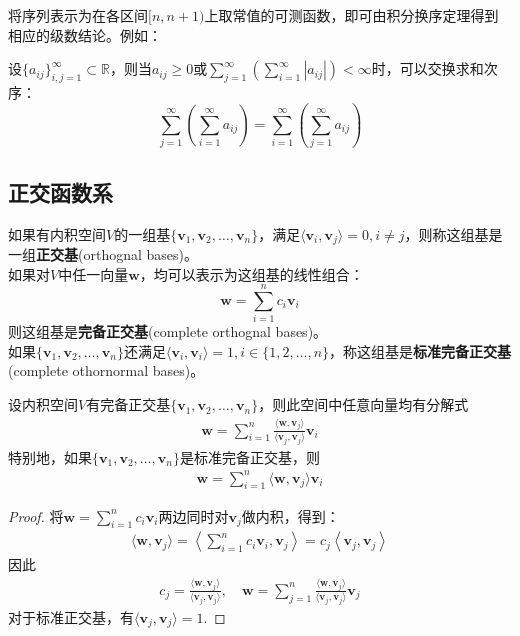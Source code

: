 将序列表示为在各区间$[n,n+1)$上取常值的可测函数，即可由积分换序定理得到相应的级数结论。例如：
\begin{corollary}\label{cor:sequence_fubini_tonelli}
    设$\{a_{ij}\}_{i,j=1}^{\infty}\subset\mathbb{R}$，则当$a_{ij}\ge 0$或$\sum_{j=1}^{\infty}\left(\sum_{i=1}^{\infty}|a_{ij}|\right)<\infty$时，可以交换求和次序：
    $$\sum_{j=1}^{\infty}\left(\sum_{i=1}^{\infty}a_{ij}\right)=\sum_{i=1}^{\infty}\left(\sum_{j=1}^{\infty}a_{ij}\right)$$
\end{corollary}

\subsection{正交函数系}\label{sub:orthognal}
\begin{definition}[正交基]
    如果有内积空间$V$的一组基$\{\mathbf{v}_1,\mathbf{v}_2,\dots ,\mathbf{v}_n\}$，满足$\langle \mathbf{v}_i,\mathbf{v}_j\rangle =0,i \neq j$，则称这组基是一组\textbf{正交基}(orthognal bases)。\\
    如果对$V$中任一向量$\mathbf{w}$，均可以表示为这组基的线性组合：
    \[\mathbf{w}=\sum_{i = 1}^{n}  c_i \mathbf{v}_i\]
    则这组基是\textbf{完备正交基}(complete orthognal bases)。\\
    如果$\{\mathbf{v}_1,\mathbf{v}_2,\dots ,\mathbf{v}_n\}$还满足$\langle \mathbf{v}_i,\mathbf{v}_i\rangle =1,i\in \{1,2,\dots ,n\}$，称这组基是\textbf{标准完备正交基} (complete othornormal bases)。
\end{definition}

\begin{theorem}\label{thm:vector_decomposition}
    设内积空间$V$有完备正交基$\{\mathbf{v}_1,\mathbf{v}_2,\dots ,\mathbf{v}_n\}$，则此空间中任意向量均有分解式
    \begin{align*}
        \mathbf{w}=\sum_{i=1}^{n}\frac{\langle \mathbf{w},\mathbf{v}_j \rangle}{\langle \mathbf{v}_j,\mathbf{v}_j \rangle}\mathbf{v}_i
    \end{align*}
    特别地，如果$\{\mathbf{v}_1,\mathbf{v}_2,\dots ,\mathbf{v}_n\}$是标准完备正交基，则
    \begin{align*}
        \mathbf{w}=\sum_{i=1}^{n}\langle \mathbf{w},\mathbf{v}_j \rangle\mathbf{v}_i
    \end{align*}
\end{theorem}
\begin{proof}
    将$\mathbf{w}=\sum_{i = 1}^{n}  c_i \mathbf{v}_i$两边同时对$\mathbf{v}_j$做内积，得到：
    \begin{align*}
        \langle \mathbf{w},\mathbf{v}_j \rangle=\left\langle \sum_{i = 1}^{n}  c_i \mathbf{v}_i,\mathbf{v}_j \right\rangle =c_j\left\langle \mathbf{v}_j,\mathbf{v}_j \right\rangle
    \end{align*}
    因此\begin{align*}
        c_j=\frac{\langle \mathbf{w},\mathbf{v}_j \rangle}{\langle \mathbf{v}_j,\mathbf{v}_j \rangle},\quad\mathbf{w}=\sum_{j = 1}^{n}  \frac{\langle \mathbf{w},\mathbf{v}_j \rangle}{\langle \mathbf{v}_j,\mathbf{v}_j \rangle} \mathbf{v}_j
    \end{align*}
    对于标准正交基，有$\langle \mathbf{v}_j,\mathbf{v}_j \rangle=1$.
\end{proof}

